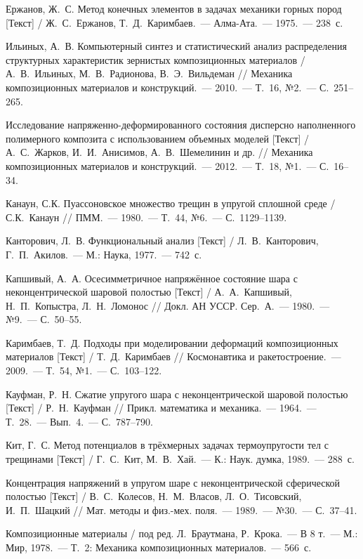 \begin{biblist}{99}
Ержанов, Ж.~С. Метод конечных элементов в задачах механики горных пород [Текст] 
/ Ж.~С.~Ержанов, Т.~Д.~Каримбаев.~--- Алма-Ата.~--- 1975.~--- 238~с.

Ильиных, А.~В. 
Компьютерный синтез и статистический анализ распределения структурных характеристик зернистых композиционных материалов 
/ А.~В.~Ильиных, М.~В.~Радионова, В.~Э.~Вильдеман 
// Механика композиционных материалов и конструкций.~--- 2010.~--- Т.~16, №2.~--- С.~251--265.

Исследование напряженно-деформированного состояния дисперсно наполненного полимерного композита с использованием объемных моделей [Текст] 
/ А.~С.~Жарков, И.~И.~Анисимов, А.~В.~Шемелинин и др. 
// Механика композиционных материалов и конструкций.~--- 2012.~--- Т.~18, №1.~--- С.~16--34.

Канаун, С.К. 
Пуассоновское множество трещин в упругой сплошной среде  
/ С.К.~Канаун 
// ПММ.~--- 1980.~--- Т.~44, №6.~--- С.~1129--1139.

Канторович, Л.~В. 
Функциональный анализ [Текст] / Л.~В.~Канторович, Г.~П.~Акилов.~--- М.: Наука, 1977.~--- 742~с.

Капшивый, А.~А. 
Осесимметричное напряжённое состояние шара с неконцентрической шаровой полостью [Текст] 
/ А.~А.~Капшивый, Н.~П.~Копыстра, Л.~Н.~Ломонос 
// Докл. АН УССР. Сер.~А.~--- 1980.~--- №9.~--- С.~50--55.

Каримбаев, Т.~Д. 
Подходы при моделировании деформаций композиционных материалов [Текст] / Т.~Д.~Каримбаев 
// Космонавтика и ракетостроение.~--- 2009.~--- Т.~54, №1.~--- С.~103--122.

Кауфман, Р.~Н. 
Сжатие упругого шара с неконцентрической шаровой полостью [Текст] 
/ Р.~Н.~Кауфман 
// Прикл. математика и механика.~--- 1964.~--- Т.~28.~--- Вып.~4.~--- С.~787--790.

Кит, Г.~С. 
Метод потенциалов в трёхмерных задачах термоупругости тел с трещинами [Текст] 
/ Г.~С.~Кит, М.~В.~Хай.~--- К.: Наук. думка, 1989.~--- 288~с.

Концентрация напряжений в упругом шаре с неконцентрической сферической полостью [Текст] 
/ В.~С.~Колесов, Н.~М.~Власов, Л.~О.~Тисовский, И.~П.~Шацкий 
// Мат. методы и физ.-мех. поля.~--- 1989.~--- №30.~--- С.~37--41.

Композиционные материалы 
/ под ред. Л.~Браутмана, Р.~Крока.~--- В 8 т.~--- М.: Мир, 1978.~--- Т.~2: Механика композиционных материалов.~--- 566~с.


\end{biblist}
